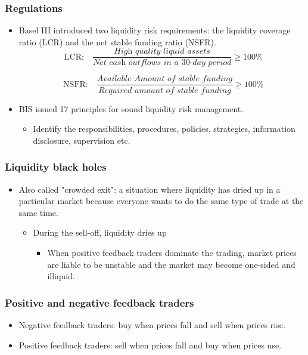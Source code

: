 \subsubsection{Regulations}
\begin{itemize}
\item Basel III introduced two liquidity risk requirements: the liquidity coverage ratio (LCR) and the net stable funding ratio (NSFR).
    \[
\text{\ LCR:}\quad
\frac{\textit{High quality liquid assets}}{\textit{Net cash outflows in a 30-day period}} \geq 100\%
\]

\[
\text{\ NSFR:}\quad
\frac{\textit{Available Amount of stable funding}}{\textit{Required amount of stable funding}} \geq 100\%
\]
\item BIS issued 17 principles for sound liquidity risk management.
    \begin{itemize}
    \item Identify the responsibilities, procedures, policies, strategies, information disclosure, supervision etc.
    \end{itemize}
\end{itemize}



\subsubsection{Liquidity black holes}
\begin{itemize}
\item Also called "crowded exit": a situation where liquidity has dried up in a particular market because everyone wants to do the same type of trade at the same time.
    \begin{itemize}
    \item During the sell-off, liquidity dries up
        \begin{itemize}
        \item When positive feedback traders dominate the trading, market prices are liable to be unstable and the market may become one-sided and illiquid.
        \end{itemize}
    \end{itemize}
\end{itemize}



\subsubsection{Positive and negative feedback traders}
\begin{itemize}
    \item Negative feedback traders: buy when prices fall and sell when prices rise.
    \item Positive feedback traders: sell when prices fall and buy when prices nse.
\end{itemize}



